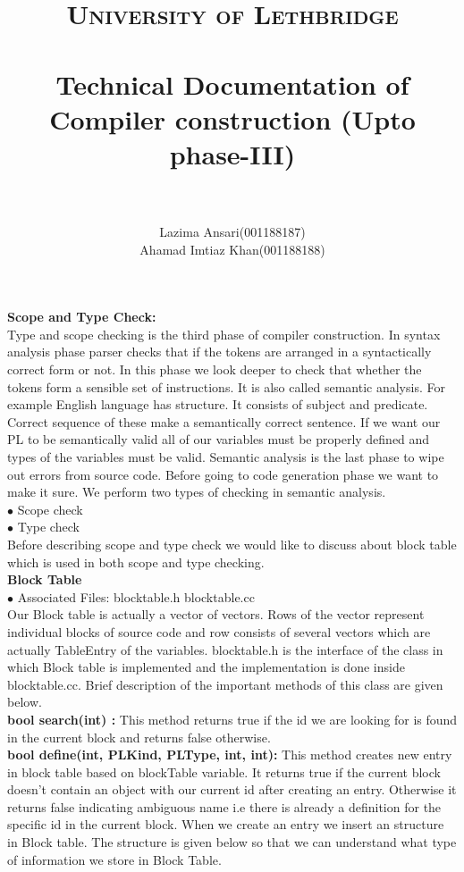 \documentclass[paper=letter, fontsize=12pt]{scrartcl} %
\title{	
\normalfont \normalsize 
\textsc{University of Lethbridge} \\ [25pt] %
\horrule{0.5pt} \\[0.4cm] %
\huge Technical Documentation of Compiler construction (Upto phase-III)\\ %
\horrule{2pt} \\[0.5cm] %
}
\author{Lazima Ansari(001188187) \\ Ahamad Imtiaz Khan(001188188)} %
\begin{document}
\maketitle
\newpage


{\bf {\huge Scope and Type Check:}}\\
Type and scope checking is the third phase of compiler construction. In syntax analysis phase parser checks that if the tokens are arranged in a syntactically correct form or not. In this phase we look deeper to check that whether the tokens form a sensible set of instructions. It is also called semantic analysis. For example English language has structure. It consists of subject and predicate. Correct sequence of these make a semantically correct sentence. If we want our PL to be semantically valid all of our variables must be properly defined and types of the variables must be valid. Semantic analysis is the last phase to wipe out errors from source code. Before going to code generation phase we want to make it sure. We perform two types of checking in semantic analysis.\\

$\bullet$ Scope check\\
$\bullet$ Type check\\

Before describing scope and type check we would like to discuss about block table which is used in both scope and type checking.\\

{\bf Block Table}\\
$\bullet$ Associated Files: blocktable.h blocktable.cc\\
Our Block table is actually a vector of vectors. Rows of the vector represent individual blocks of source code and row consists of several vectors which are actually TableEntry of the variables. blocktable.h is the interface of the class in which Block table is implemented and the implementation is done inside blocktable.cc. Brief description of the important methods of this class are given below.\\
{\bf bool search(int) :} This method returns true if the id we are looking for is found in the current block and returns false otherwise.\\
{\bf bool define(int, PL\textunderscore Kind, PL\textunderscore Type, int, int):} This method creates new entry in block table based on blockTable variable. It returns true if the current block doesn't contain an object with our current id after creating an entry. Otherwise it returns false indicating ambiguous name i.e there is already a definition for the specific id 
in the current block. When we create an entry we insert an structure in Block table. The structure is given below so that we can understand what type of information we store in Block Table.\\
\end{document}
